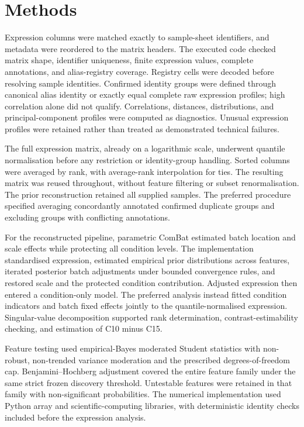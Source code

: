 \documentclass[10pt,a4paper]{article}
\begin{document}
\section*{Methods}
Expression columns were matched exactly to sample-sheet identifiers, and metadata were reordered to the matrix headers. The executed code checked matrix shape, identifier uniqueness, finite expression values, complete annotations, and alias-registry coverage. Registry cells were decoded before resolving sample identities. Confirmed identity groups were defined through canonical alias identity or exactly equal complete raw expression profiles; high correlation alone did not qualify. Correlations, distances, distributions, and principal-component profiles were computed as diagnostics. Unusual expression profiles were retained rather than treated as demonstrated technical failures.
\par
The full expression matrix, already on a logarithmic scale, underwent quantile normalisation before any restriction or identity-group handling. Sorted columns were averaged by rank, with average-rank interpolation for ties. The resulting matrix was reused throughout, without feature filtering or subset renormalisation. The prior reconstruction retained all supplied samples. The preferred procedure specified averaging concordantly annotated confirmed duplicate groups and excluding groups with conflicting annotations.
\par
For the reconstructed pipeline, parametric ComBat estimated batch location and scale effects while protecting all condition levels. The implementation standardised expression, estimated empirical prior distributions across features, iterated posterior batch adjustments under bounded convergence rules, and restored scale and the protected condition contribution. Adjusted expression then entered a condition-only model. The preferred analysis instead fitted condition indicators and batch fixed effects jointly to the quantile-normalised expression. Singular-value decomposition supported rank determination, contrast-estimability checking, and estimation of C10 minus C15.
\par
Feature testing used empirical-Bayes moderated Student statistics with non-robust, non-trended variance moderation and the prescribed degrees-of-freedom cap. Benjamini–Hochberg adjustment covered the entire feature family under the same strict frozen discovery threshold. Untestable features were retained in that family with non-significant probabilities. The numerical implementation used Python array and scientific-computing libraries, with deterministic identity checks included before the expression analysis.
\end{document}

